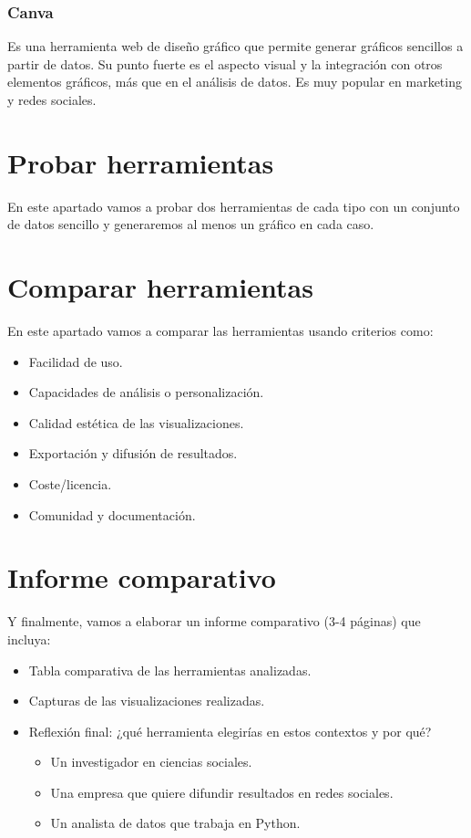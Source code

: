 \documentclass{../../miPlantilla}
\begin{document}
\subsubsection{Canva}
Es una herramienta web de diseño gráfico que permite generar gráficos sencillos a partir de datos. Su punto fuerte es el aspecto visual y
la integración con otros elementos gráficos, más que en el análisis de datos. Es muy popular en marketing y redes sociales.

\newpage

\section{Probar herramientas}
En este apartado vamos a probar dos herramientas de cada tipo con un conjunto de datos sencillo y generaremos al menos un gráfico en cada caso.

\newpage

\section{Comparar herramientas}
En este apartado vamos a comparar las herramientas usando criterios como:
\begin{itemize}
    \item Facilidad de uso.
    \item Capacidades de análisis o personalización.
    \item Calidad estética de las visualizaciones.
    \item Exportación y difusión de resultados.
    \item Coste/licencia.
    \item Comunidad y documentación.
\end{itemize}

\newpage

\section{Informe comparativo}
Y finalmente, vamos a elaborar un informe comparativo (3-4 páginas) que incluya:
\begin{itemize}
    \item Tabla comparativa de las herramientas analizadas.
    \item Capturas de las visualizaciones realizadas.
    \item Reflexión final: ¿qué herramienta elegirías en estos contextos y por qué?
        \begin{itemize}
            \item Un investigador en ciencias sociales.
            \item Una empresa que quiere difundir resultados en redes sociales.
            \item Un analista de datos que trabaja en Python.
        \end{itemize}
\end{itemize}
\end{document}
